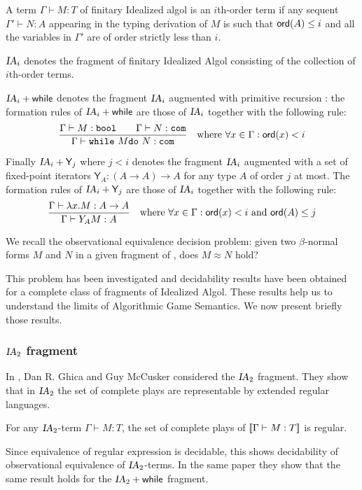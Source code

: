 \begin{dfn}
A term $\Gamma \vdash M:T$ of finitary Idealized algol is an $i$th-order term if any sequent $\Gamma' \vdash N:A$ appearing
in the typing derivation of $M$ is such that ${\sf ord}(A) \leq i$ and all the variables in $\Gamma'$ are of order strictly less than $i$.
\end{dfn}

$\textsl{IA}_i$ denotes the fragment of finitary Idealized Algol
consisting of the collection of $i$th-order terms.

$\textsl{IA}_i + \textsf{while}$ denotes the fragment $\textsl{IA}_i$ augmented with
primitive recursion : the formation rules of $\textsl{IA}_i + \textsf{while}$  are those
of $\textsl{IA}_i$ together with the following rule:
$$  \frac{\displaystyle \Gamma \vdash M : \texttt{bool} \qquad \Gamma \vdash N : \texttt{com}}{\Gamma \vdash \texttt{while}\ M \texttt{do}\ N : \texttt{com} } \quad \mbox{where } \forall x \in \Gamma : {\sf ord}(x) < i $$

Finally $\textsl{IA}_i + \textsf{Y}_j$ where $j
< i$ denotes the fragment $\textsl{IA}_i$ augmented with a set of
fixed-point iterators $\textsf{Y}_A : (A\rightarrow A ) \rightarrow
A$ for any type $A$ of order $j$ at most. The formation rules of $\textsl{IA}_i + \textsf{Y}_j$  are those
of $\textsl{IA}_i$ together with the following rule:
$$  \frac{\displaystyle \Gamma \vdash \lambda x . M : A\rightarrow A}{\Gamma \vdash Y_A M : A} \quad \mbox{where } \forall x \in \Gamma : {\sf ord}(x) < i
                                                                            \mbox{ and } {\sf ord}(A) \leq j $$

We recall the observational equivalence decision problem: given two
$\beta$-normal forms $M$ and $N$ in a given fragment of \ialgol,
does $M \approx N$ hold?

This problem has been investigated and decidability results have
been obtained for a complete class of fragments of Idealized Algol.
These results help us to understand the limits of Algorithmic Game
Semantics. We now present briefly those results.

\subsubsection{$\textsl{IA}_2$ fragment}
In \cite{ghicamccusker00}, Dan R. Ghica and Guy McCusker considered the $\textsl{IA}_2$ fragment.
They show that in $\textsl{IA}_2$ the set of complete plays are
representable by extended regular languages.

\begin{lem}
For any $\textsl{IA}_2$-term $\Gamma \vdash M : T$, the set of complete
plays of ${[\![ \Gamma \vdash M : T ]\!]}$ is regular.
\end{lem}
Since equivalence of regular expression is decidable, this shows
decidability of observational equivalence of $\textsl{IA}_2$-terms. In
the same paper they show that the same result holds for the
$\textsl{IA}_2 +\textsf{while}$ fragment.

